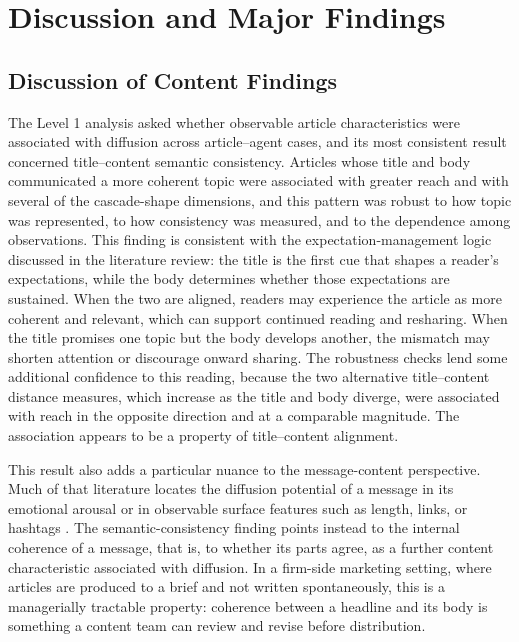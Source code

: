 ﻿\chapter{Discussion and Major Findings}
\label{chap:discussion-and-major-findings}

\section{Discussion of Content Findings}
\label{sec:7-1-discussion-of-content-findings}

The Level 1 analysis asked whether observable article characteristics were associated with diffusion across article–agent cases, and its most consistent result concerned title–content semantic consistency. Articles whose title and body communicated a more coherent topic were associated with greater reach and with several of the cascade-shape dimensions, and this pattern was robust to how topic was represented, to how consistency was measured, and to the dependence among observations. This finding is consistent with the expectation-management logic discussed in the literature review: the title is the first cue that shapes a reader's expectations, while the body determines whether those expectations are sustained. When the two are aligned, readers may experience the article as more coherent and relevant, which can support continued reading and resharing. When the title promises one topic but the body develops another, the mismatch may shorten attention or discourage onward sharing. The robustness checks lend some additional confidence to this reading, because the two alternative title–content distance measures, which increase as the title and body diverge, were associated with reach in the opposite direction and at a comparable magnitude. The association appears to be a property of title–content alignment.

This result also adds a particular nuance to the message-content perspective. Much of that literature locates the diffusion potential of a message in its emotional arousal or in observable surface features such as length, links, or hashtags \parencite{bergermilkman2012,lahuertaotero2018}. The semantic-consistency finding points instead to the internal coherence of a message, that is, to whether its parts agree, as a further content characteristic associated with diffusion. In a firm-side marketing setting, where articles are produced to a brief and not written spontaneously, this is a managerially tractable property: coherence between a headline and its body is something a content team can review and revise before distribution.

